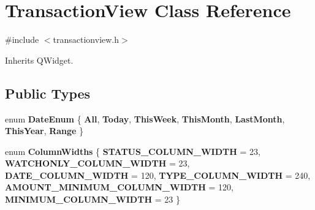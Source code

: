 \hypertarget{class_transaction_view}{}\section{Transaction\+View Class Reference}
\label{class_transaction_view}


{\ttfamily \#include $<$transactionview.\+h$>$}



Inherits Q\+Widget.

\subsection*{Public Types}
\begin{DoxyCompactItemize}
\item 
\mbox{\label{class_transaction_view_a73d1bbedc72fa131591aadb3aba150f8}} 
enum {\bfseries Date\+Enum} \{ \newline
{\bfseries All}, 
{\bfseries Today}, 
{\bfseries This\+Week}, 
{\bfseries This\+Month}, 
\newline
{\bfseries Last\+Month}, 
{\bfseries This\+Year}, 
{\bfseries Range}
 \}
\item 
\mbox{\label{class_transaction_view_a330f6333f7d24ceef963729fa35fe985}} 
enum {\bfseries Column\+Widths} \{ \newline
{\bfseries S\+T\+A\+T\+U\+S\+\_\+\+C\+O\+L\+U\+M\+N\+\_\+\+W\+I\+D\+TH} = 23, 
{\bfseries W\+A\+T\+C\+H\+O\+N\+L\+Y\+\_\+\+C\+O\+L\+U\+M\+N\+\_\+\+W\+I\+D\+TH} = 23, 
{\bfseries D\+A\+T\+E\+\_\+\+C\+O\+L\+U\+M\+N\+\_\+\+W\+I\+D\+TH} = 120, 
{\bfseries T\+Y\+P\+E\+\_\+\+C\+O\+L\+U\+M\+N\+\_\+\+W\+I\+D\+TH} = 240, 
\newline
{\bfseries A\+M\+O\+U\+N\+T\+\_\+\+M\+I\+N\+I\+M\+U\+M\+\_\+\+C\+O\+L\+U\+M\+N\+\_\+\+W\+I\+D\+TH} = 120, 
{\bfseries M\+I\+N\+I\+M\+U\+M\+\_\+\+C\+O\+L\+U\+M\+N\+\_\+\+W\+I\+D\+TH} = 23
 \}
\end{DoxyCompactItemize}
